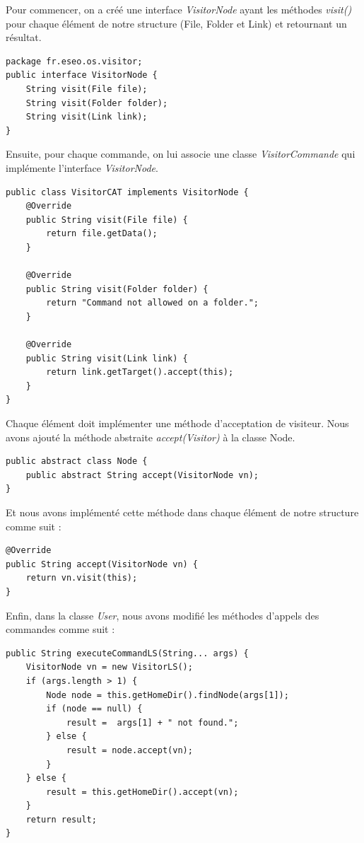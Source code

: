 Pour commencer, on a créé une interface \emph{VisitorNode} ayant les méthodes \emph{visit()} pour chaque élément de notre structure (File, Folder et Link) et retournant un résultat.

\begin{lstlisting}
package fr.eseo.os.visitor;
public interface VisitorNode {
	String visit(File file);
	String visit(Folder folder);
	String visit(Link link);
}
\end{lstlisting}

Ensuite, pour chaque commande, on lui associe une classe \emph{VisitorCommande} qui implémente l'interface \emph{VisitorNode}.

\begin{lstlisting}
public class VisitorCAT implements VisitorNode {
	@Override
	public String visit(File file) {
		return file.getData();
	}

	@Override
	public String visit(Folder folder) {
		return "Command not allowed on a folder.";
	}

	@Override
	public String visit(Link link) {
		return link.getTarget().accept(this);
	}
}
\end{lstlisting}

Chaque élément doit implémenter une méthode d'acceptation de visiteur. Nous avons ajouté la méthode abstraite \emph{accept(Visitor)} à la classe Node. 


\begin{lstlisting}
public abstract class Node {
	public abstract String accept(VisitorNode vn);
}
\end{lstlisting}


Et nous avons implémenté cette méthode dans chaque élément de notre structure comme suit :

\begin{lstlisting}
@Override
public String accept(VisitorNode vn) {
	return vn.visit(this);
}
\end{lstlisting}

Enfin, dans la classe \emph{User}, nous avons modifié les méthodes d'appels des commandes comme suit :

\begin{lstlisting}
public String executeCommandLS(String... args) {
    VisitorNode vn = new VisitorLS();
	if (args.length > 1) {
		Node node = this.getHomeDir().findNode(args[1]);
		if (node == null) {
            result =  args[1] + " not found.";
        } else {
            result = node.accept(vn);
        }
	} else {
		result = this.getHomeDir().accept(vn);
	}
	return result;
}
\end{lstlisting}
